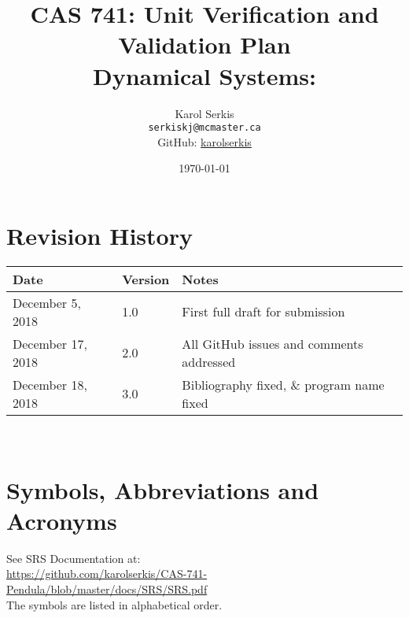 \documentclass[12pt, titlepage]{article}
\begin{document}
\title{CAS 741: Unit Verification and Validation Plan\\[10pt]
\Large Dynamical Systems: \progname}
\author{Karol Serkis\\\texttt{serkiskj@mcmaster.ca}\\GitHub:
\href{https://www.github.com/karolserkis}{karolserkis}}
\date{\today}
	
\maketitle


\section{Revision History}

\begin{tabularx}{\textwidth}{p{4cm}p{2cm}X}
\toprule {\bf Date} & {\bf Version} & {\bf Notes}\\
\midrule
December 5, 2018 & 1.0 &  First full draft for submission\\
December 17, 2018 & 2.0 & All GitHub issues and comments addressed \\
December 18, 2018 & 3.0 & Bibliography fixed, 
\& program name fixed \\
\bottomrule
\end{tabularx}

~\newpage

\section{Symbols, Abbreviations and Acronyms}

See SRS Documentation at:\\
\url{https://github.com/karolserkis/CAS-741-Pendula/blob/master/docs/SRS/SRS.pdf}\\
The symbols are listed in alphabetical order.\\
\end{document}
